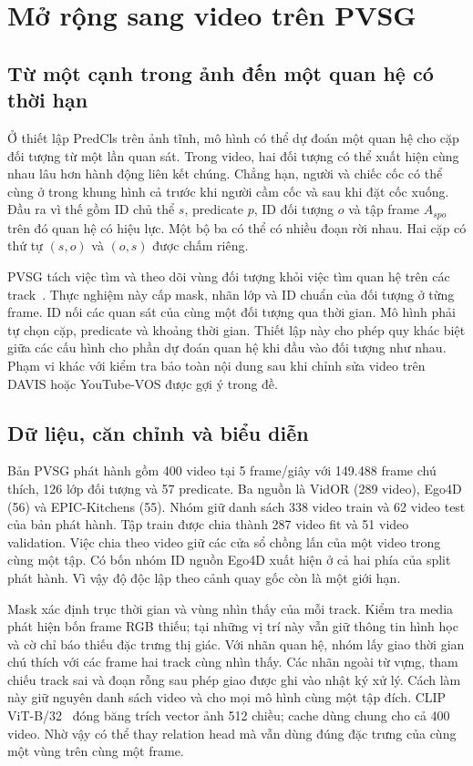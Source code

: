 \section{Mở rộng sang video trên PVSG}
\subsection{Từ một cạnh trong ảnh đến một quan hệ có thời hạn}
Ở thiết lập PredCls trên ảnh tĩnh, mô hình có thể dự đoán một quan hệ cho cặp
đối tượng từ một lần quan sát. Trong video, hai đối tượng có thể xuất hiện cùng
nhau lâu hơn hành động liên kết chúng. Chẳng hạn, người và chiếc cốc có thể
cùng ở trong khung hình cả trước khi người cầm cốc và sau khi đặt cốc xuống.
Đầu ra vì thế gồm ID chủ thể $s$, predicate $p$, ID đối tượng $o$ và tập frame
$A_{spo}$ trên đó quan hệ có hiệu lực. Một bộ ba có thể có nhiều đoạn rời nhau.
Hai cặp có thứ tự $(s,o)$ và $(o,s)$ được chấm riêng.

PVSG tách việc tìm và theo dõi vùng đối tượng khỏi việc tìm quan hệ trên
các track~\cite{yang2023pvsg}. Thực nghiệm này cấp mask, nhãn lớp và ID chuẩn
của đối tượng ở từng frame. ID nối các quan sát của cùng một đối tượng qua
thời gian. Mô hình phải tự chọn cặp, predicate và khoảng thời gian. Thiết lập
này cho phép quy khác biệt giữa các cấu hình cho phần dự đoán quan hệ khi đầu
vào đối tượng như nhau. Phạm vi khác với kiểm tra bảo toàn nội dung sau khi
chỉnh sửa video trên DAVIS hoặc YouTube-VOS được gợi ý trong đề.

\subsection{Dữ liệu, căn chỉnh và biểu diễn}
Bản PVSG phát hành gồm 400 video tại 5 frame/giây với 149.488 frame chú thích,
126 lớp đối tượng và 57 predicate. Ba nguồn là VidOR (289 video), Ego4D (56)
và EPIC-Kitchens (55). Nhóm giữ danh sách 338 video train và 62 video test
của bản phát hành. Tập train được chia thành 287 video fit và 51 video
validation. Việc chia theo video giữ các cửa sổ chồng lấn của một video trong
cùng một tập. Có bốn nhóm ID nguồn Ego4D xuất hiện ở cả hai phía của split phát
hành. Vì vậy độ độc lập theo cảnh quay gốc còn là một giới hạn.

Mask xác định trục thời gian và vùng nhìn thấy của mỗi track. Kiểm tra media phát
hiện bốn frame RGB thiếu; tại những vị trí này vẫn giữ thông tin hình học và
cờ chỉ báo thiếu đặc trưng thị giác. Với nhãn quan hệ, nhóm lấy giao thời gian
chú thích với các frame hai track cùng nhìn thấy. Các nhãn ngoài từ vựng,
tham chiếu track sai và đoạn rỗng sau phép giao được ghi vào nhật ký xử lý.
Cách làm này giữ nguyên danh sách video và cho mọi mô hình cùng một tập đích.
CLIP ViT-B/32~\cite{radford2021clip} đóng băng trích vector ảnh 512 chiều; cache dùng chung cho cả
400 video. Nhờ vậy có thể thay relation head mà vẫn dùng đúng đặc trưng
của cùng một vùng trên cùng một frame.

